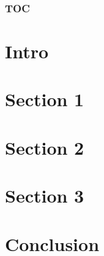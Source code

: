 \documentclass{beamer}
\begin{document}
\begin{frame}
\frametitle{TOC}
\tableofcontents
\end{frame}

\section*{Intro}
\begin{frame}
\end{frame}

\section{Section 1}
\begin{frame}
\end{frame}

\section{Section 2}
\begin{frame}
\end{frame}

\section{Section 3}
\begin{frame}
\end{frame}

\section*{Conclusion}
\begin{frame}
\end{frame}
\end{document}
